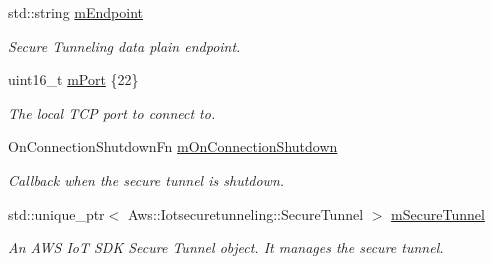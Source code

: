 \begin{DoxyCompactItemize}
std\+::string \hyperlink{class_aws_1_1_iot_1_1_device_client_1_1_secure_tunneling_1_1_secure_tunneling_context_aa07933f466bffedac5718eb90961691a}{m\+Endpoint}
\begin{DoxyCompactList}\small\item\em Secure Tunneling data plain endpoint. \end{DoxyCompactList}\item 
\mbox{\label{class_aws_1_1_iot_1_1_device_client_1_1_secure_tunneling_1_1_secure_tunneling_context_ae87a537fedeb6aef41ba8f7352fc2a86}} 
uint16\+\_\+t \hyperlink{class_aws_1_1_iot_1_1_device_client_1_1_secure_tunneling_1_1_secure_tunneling_context_ae87a537fedeb6aef41ba8f7352fc2a86}{m\+Port} \{22\}
\begin{DoxyCompactList}\small\item\em The local T\+CP port to connect to. \end{DoxyCompactList}\item 
\mbox{\label{class_aws_1_1_iot_1_1_device_client_1_1_secure_tunneling_1_1_secure_tunneling_context_a6e2f845575d6e01a4dcf11585b79948a}} 
On\+Connection\+Shutdown\+Fn \hyperlink{class_aws_1_1_iot_1_1_device_client_1_1_secure_tunneling_1_1_secure_tunneling_context_a6e2f845575d6e01a4dcf11585b79948a}{m\+On\+Connection\+Shutdown}
\begin{DoxyCompactList}\small\item\em Callback when the secure tunnel is shutdown. \end{DoxyCompactList}\item 
\mbox{\label{class_aws_1_1_iot_1_1_device_client_1_1_secure_tunneling_1_1_secure_tunneling_context_a4f4a7c085ff9a1f4d1c4df317e986823}} 
std\+::unique\+\_\+ptr$<$ Aws\+::\+Iotsecuretunneling\+::\+Secure\+Tunnel $>$ \hyperlink{class_aws_1_1_iot_1_1_device_client_1_1_secure_tunneling_1_1_secure_tunneling_context_a4f4a7c085ff9a1f4d1c4df317e986823}{m\+Secure\+Tunnel}
\begin{DoxyCompactList}\small\item\em An A\+WS IoT S\+DK Secure Tunnel object. It manages the secure tunnel. \end{DoxyCompactList}\item 

\end{DoxyCompactItemize}
